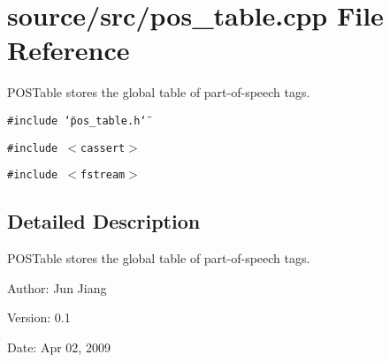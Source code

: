 \section{source/src/pos\_\-table.cpp File Reference}
\label{pos__table_8cpp}
POSTable stores the global table of part-of-speech tags.  


{\tt \#include \char`\"{}pos\_\-table.h\char`\"{}}\par
{\tt \#include $<$cassert$>$}\par
{\tt \#include $<$fstream$>$}\par


\subsection{Detailed Description}
POSTable stores the global table of part-of-speech tags. 

\begin{Desc}
\item[Author:]Jun Jiang \end{Desc}
\begin{Desc}
\item[Version:]0.1 \end{Desc}
\begin{Desc}
\item[Date:]Apr 02, 2009 \end{Desc}
